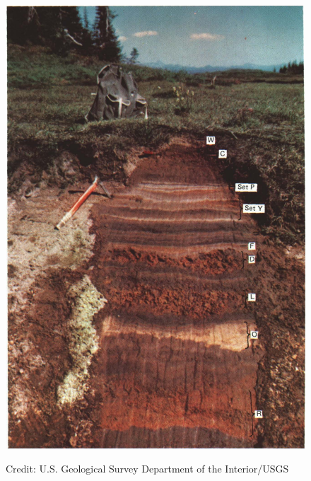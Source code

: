 \documentclass{beamer} %
\begin{document}
\begin{frame}
\begin{minipage}{.40\textwidth}
	\begin{figure}
	\includegraphics[width = \textwidth]{rainiertephra}
	
	\tiny{Credit: U.S. Geological Survey 
Department of the Interior/USGS}
	\end{figure}
	\end{minipage}
\end{frame}


\end{document}
